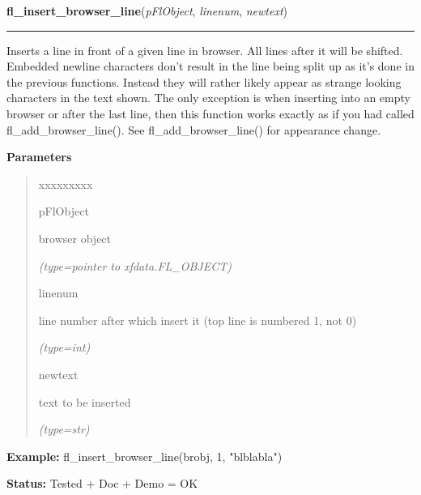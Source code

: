     \vspace{0.5ex}

\hspace{.8\funcindent}\begin{boxedminipage}{\funcwidth}

    \raggedright \textbf{fl\_insert\_browser\_line}(\textit{pFlObject}, \textit{linenum}, \textit{newtext})

    \vspace{-1.5ex}

    \rule{\textwidth}{0.5\fboxrule}
\setlength{\parskip}{2ex}
    Inserts a line in front of a given line in browser. All lines after it 
    will be shifted. Embedded newline characters don't result in the line 
    being split up as it's done in the previous functions. Instead they 
    will rather likely appear as strange looking characters in the text 
    shown. The only exception is when inserting into an empty browser or 
    after the last line, then this function works exactly as if you had 
    called fl\_add\_browser\_line(). See fl\_add\_browser\_line() for 
    appearance change.

\setlength{\parskip}{1ex}
      \textbf{Parameters}
      \vspace{-1ex}

      \begin{quote}
        \begin{Ventry}{xxxxxxxxx}

          \item[pFlObject]

          browser object

            {\it (type=pointer to xfdata.FL\_OBJECT)}

          \item[linenum]

          line number after which insert it (top line is numbered 1, not 0)

            {\it (type=int)}

          \item[newtext]

          text to be inserted

            {\it (type=str)}

        \end{Ventry}

      \end{quote}

\textbf{Example:} fl\_insert\_browser\_line(brobj, 1, "blblabla")



\textbf{Status:} Tested + Doc + Demo = OK



    \end{boxedminipage}

